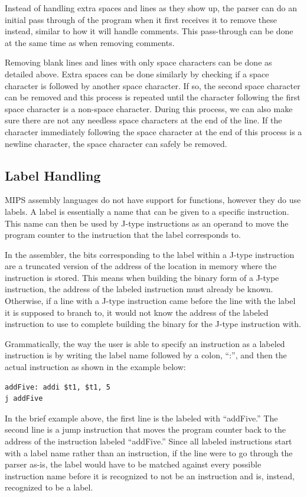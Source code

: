 \documentclass[
    parskip=half,
    fontsize=12pt,
    titlepage=firstiscover,
    toc=bibliography,
    numbers=endperiod
]{scrartcl}
\begin{document}
Instead of handling extra spaces and lines as they show up, the parser
can do an initial pass through of the program when it first receives it
to remove these instead, similar to how it will handle comments. This
pass-through can be done at the same time as when removing comments.

Removing blank lines and lines with only space characters can be done as
detailed above. Extra spaces can be done similarly by checking if a
space character is followed by another space character. If so, the
second space character can be removed and this process is repeated until
the character following the first space character is a non-space
character. During this process, we can also make sure there are not any
needless space characters at the end of the line. If the character
immediately following the space character at the end of this process is
a newline character, the space character can safely be removed.

\subsection{Label Handling}

MIPS assembly languages do not have support for functions, however they
do use labels. A label is essentially a name that can be given to a
specific instruction. This name can then be used by J-type instructions
as an operand to move the program counter to the instruction that the
label corresponds to.

In the assembler, the bits corresponding to the label within a J-type
instruction are a truncated version of the address of the location in
memory where the instruction is stored. This means when building
the binary form of a J-type instruction, the address of the labeled
instruction must already be known. Otherwise, if a line with a J-type
instruction came before the line with the label it is supposed to branch
to, it would not know the address of the labeled instruction to use to
complete building the binary for the J-type instruction with.

Grammatically, the way the user is able to specify an instruction as a
labeled instruction is by writing the label name followed by a colon,
``:'', and then the actual instruction as shown in the example below:

\begin{verbatim}
addFive: addi $t1, $t1, 5
j addFive
\end{verbatim}

In the brief example above, the first line is the labeled with
``addFive.'' The second line is a jump instruction that moves the
program counter back to the address of the instruction labeled
``addFive.'' Since all labeled instructions start with a label name
rather than an instruction, if the line were to go through the parser
as-is, the label would have to be matched against every possible
instruction name before it is recognized to not be an instruction and
is, instead, recognized to be a label.
\end{document}
